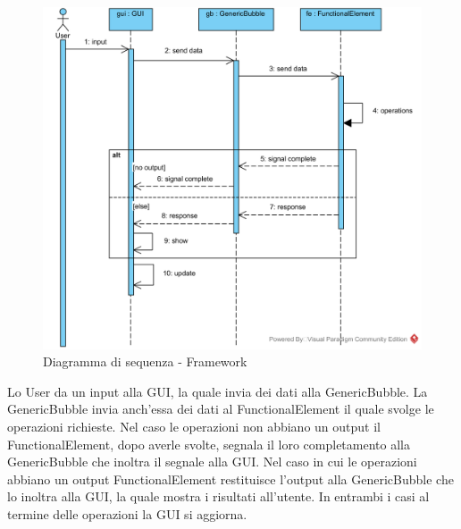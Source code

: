\begin{figure}[H]
	\centering
	\includegraphics[width=14cm]{diagrammi_img/sequenza/framework.png}
	\caption{Diagramma di sequenza - Framework}
	\label{fig:seq_framework}
\end{figure}
Lo User da un input alla GUI, la quale invia dei dati alla GenericBubble. La GenericBubble invia anch'essa dei dati al FunctionalElement il quale svolge le operazioni richieste. Nel caso le operazioni non abbiano un output il FunctionalElement, dopo averle svolte, segnala il loro completamento alla GenericBubble che inoltra il segnale alla GUI. Nel caso in cui le operazioni abbiano un output FunctionalElement restituisce l'output alla GenericBubble che lo inoltra alla GUI, la quale mostra i risultati all'utente. In entrambi i casi al termine delle operazioni la GUI si aggiorna.
